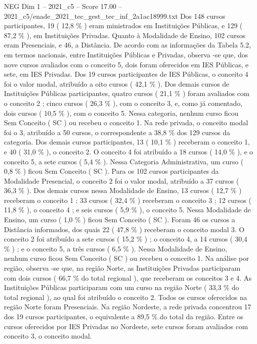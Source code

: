 \begin{textsample}{NEG Dim 1 – 2021\_c5 – Score 17.00 – 2021\_c5/enade\_2021\_tec\_gest\_tec\_inf\_2a1ac18999.txt}
Dos 148 cursos participantes, 19 ( 12,8 \% ) eram ministrados em Instituições Públicas, e 129 ( 87,2 \% ), em Instituições Privadas.
Quanto à Modalidade de Ensino, 102 cursos eram Presenciais, e 46, a Distância.
De acordo com as informações da Tabela 5.2, em termos nacionais, entre Instituições Públicas e Privadas, observa -se que, dos nove cursos avaliados com o conceito 5, dois foram oferecidos em IES Públicas, e sete, em IES Privadas.
Dos 19 cursos participantes de IES Públicas, o conceito 4 foi o valor modal, atribuído a oito cursos ( 42,1 \% ).
Dos demais cursos de Instituições Públicas participantes, quatro cursos ( 21,1 \% ) foram avaliados com o conceito 2 ; cinco cursos ( 26,3 \% ), com o conceito 3, e, como já comentado, dois cursos ( 10,5 \% ), com o conceito 5.
Nessa categoria, nenhum curso ficou Sem Conceito ( SC ) ou recebeu o conceito 1.
Na rede privada, o conceito modal foi o 3, atribuído a 50 cursos, o correspondente a 38,8 \% dos 129 cursos da categoria.
Dos demais cursos participantes, 13 ( 10,1 \% ) receberam o conceito 1, e 40 ( 31,0 \% ), o conceito 2.
O conceito 4 foi atribuído a 18 cursos ( 14,0 \% ), e o conceito 5, a sete cursos ( 5,4 \% ).
Nessa Categoria Administrativa, um curso ( 0,8 \% ) ficou Sem Conceito ( SC ).
Para os 102 cursos participantes da Modalidade Presencial, o conceito 2 foi o valor modal, atribuído a 37 cursos ( 36,3 \% ).
Dos demais cursos nessa Modalidade de Ensino, 13 cursos ( 12,7 \% ) receberam o conceito 1 ; 33 cursos ( 32,4 \% ) receberam o conceito 3 ; 12 cursos ( 11,8 \% ), o conceito 4 ; e seis cursos ( 5,9 \% ), o conceito 5.
Nessa Modalidade de Ensino, um curso ( 1,0 \% ) ficou Sem Conceito ( SC ).
Foram 46 os cursos a Distância informados, dos quais 22 ( 47,8 \% ) receberam o conceito modal 3.
O conceito 2 foi atribuído a sete cursos ( 15,2 \% ) ; o conceito 4, a 14 cursos ( 30,4 \% ) ; e o conceito 5, a três cursos ( 6,5 \% ).
Nessa Modalidade de Ensino, nenhum curso ficou Sem Conceito ( SC ) ou recebeu o conceito 1.
Na análise por região, observa -se que, na região Norte, as Instituições Privadas participaram com dois cursos ( 66,7 \% do total regional ), que receberam os conceitos 3 e 4.
As Instituições Públicas participaram com um curso na região Norte ( 33,3 \% do total regional ), ao qual foi atribuído o conceito 2.
Todos os cursos oferecidos na região Norte foram Presenciais.
Na região Nordeste, a rede privada concentrou 17 dos 19 cursos participantes, o equivalente a 89,5 \% do total da região.
Entre os cursos oferecidos por IES Privadas no Nordeste, sete cursos foram avaliados com conceito 3, o conceito modal.

\end{textsample}

